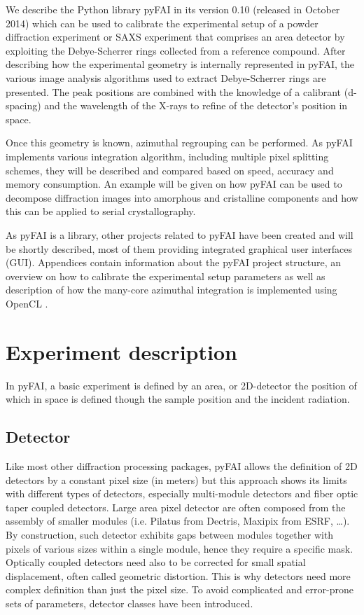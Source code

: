 \documentclass[preprint]{iucr}
\begin{document}
We describe the Python library pyFAI in its version 0.10
(released in October 2014) which can be used to calibrate the experimental
setup of a powder diffraction experiment or SAXS experiment that comprises
an area detector by exploiting the Debye-Scherrer rings collected from a
reference compound.
After describing how the experimental geometry is internally represented in
pyFAI, the various image analysis algorithms used to extract Debye-Scherrer
rings are presented.
The peak positions are combined with the knowledge of a calibrant (d-spacing)
and the wavelength of the X-rays  to refine of the detector's position in space.

Once this geometry is known, azimuthal regrouping can be performed.
As pyFAI implements various integration algorithm, including
multiple pixel splitting schemes, they will be described and compared
based on speed, accuracy and memory consumption.
An example will be given on how pyFAI can be used to decompose
diffraction images into amorphous and cristalline components and how this can be
applied to serial crystallography.

As pyFAI is a library, other projects related to pyFAI have been created and
will be shortly described, most of them providing integrated
graphical user interfaces (GUI).
Appendices contain information about the pyFAI project structure, an
overview on how to calibrate the experimental setup parameters as well as
description of how the many-core azimuthal integration is implemented using
OpenCL \cite{opencl}.

\section{Experiment description}

In pyFAI, a basic experiment is defined by an area, or 2D-detector the
position of which in space is defined though the sample position and the
incident radiation.

\subsection{Detector}
Like most other diffraction processing packages, pyFAI allows the definition of
2D detectors by a constant pixel size (in meters) but this approach shows its
limits with different types of detectors, especially multi-module detectors and fiber
optic taper coupled detectors.
Large area pixel detector are often composed from
the assembly of smaller modules (i.e. Pilatus from Dectris, Maxipix from ESRF,
\ldots).
By construction, such detector exhibits gaps between modules together with
pixels of various sizes within a single module, hence they require a specific mask.
Optically coupled detectors need also to be corrected
for small spatial displacement, often called geometric distortion.
This is why detectors need more complex definition than just the pixel size.
To avoid complicated and error-prone sets of parameters, detector classes have
been introduced.
\end{document}
